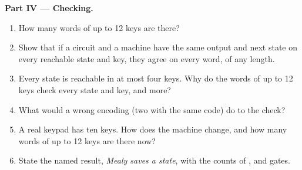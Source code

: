 \begin{problem}
\medskip\noindent\textbf{Part IV --- Checking.}
\begin{enumerate}[resume]
\item How many words of up to 12 keys are there?
\item Show that if a circuit and a machine have the same output and next state on every reachable state and key, they
agree on every word, of any length.
\item Every state is reachable in at most four keys. Why do the words of up to 12 keys check every state and key, and
more?
\item What would a wrong encoding (two  with the same code) do to the check?
\item A real keypad has ten keys. How does the machine change, and how many words of up to 12 keys are there now?
\item State the named result, \emph{Mealy saves a state}, with the counts of ,  and gates.
\end{enumerate}
\end{problem}
